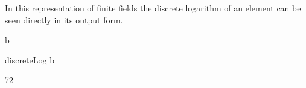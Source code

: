 {{{{{{{{{{{{{{{{{\begin{xtc}
\begin{TeXOutput}
\begin{fricasmath}{3}
%
\end{fricasmath}
\end{TeXOutput}
\end{xtc}
%
\begin{xtc}
\begin{xtccomment}
In this representation of finite fields the discrete logarithm
of an element can be seen directly in its output form.
\end{xtccomment}
\begin{spadsrc}
b 
\end{spadsrc}
\begin{TeXOutput}
\begin{fricasmath}{4}
%
\end{fricasmath}
\end{TeXOutput}
\end{xtc}
\begin{xtc}
\begin{xtccomment}
\end{xtccomment}
\begin{spadsrc}
discreteLog b 
\end{spadsrc}
\begin{TeXOutput}
\begin{fricasmath}{5}
72%
\end{fricasmath}
\end{TeXOutput}
\end{xtc}
%

}}}}}}}}}}}}}}}}}
